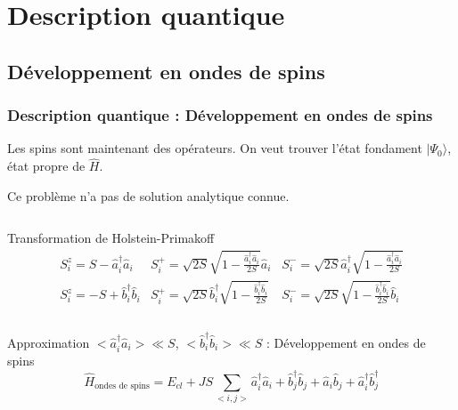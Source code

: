 \documentclass[xcolor=dvipsnames]{beamer}
\newcommand{\an}{\hat{a}}
\newcommand{\cre}{\hat{a}^\dagger}
\newcommand{\h}{\ensuremath{\hat{H}}\xspace}
\newcommand{\ban}{\hat{b}}
\newcommand{\bcre}{\hat{b}^\dagger}
\newcommand{\fond}{\ensuremath{| \Psi_0 \rangle}\xspace}
\newcommand{\1}{\ensuremath{\ket{\om_1\bom_1}}\xspace}
\newcommand{\2}{\ensuremath{\ket{\om_2\bom_2}}\xspace}
\begin{document}
\section{Description quantique}
\subsection{Développement en ondes de spins}
\begin{frame}
\frametitle{Description quantique : Développement en ondes de spins}
Les spins sont maintenant des opérateurs. On veut trouver l'état fondament \fond, état propre de \h.

Ce problème n'a pas de solution analytique connue.

\begin{columns}[t]
  \begin{column}{12cm}
  \begin{block}{Transformation de Holstein-Primakoff}
    \begin{eqnarray}
    S_i^z=S-\cre_i\an_i &  
    S_i^+=\sqrt{2S}\sqrt{1-\frac{\cre_i\an_i}{2S}}\an_i &
    S_i^-=\sqrt{2S}\cre_i\sqrt{1-\frac{\cre_i\an_i}{2S}} \\
	S_i^z=-S+\bcre_i\ban_i & 
	S_i^+=\sqrt{2S}\bcre_i\sqrt{1-\frac{\bcre_i\ban_i}{2S}}\ &
	S_i^-=\sqrt{2S}\sqrt{1-\frac{\bcre_i\ban_i}{2S}}\ban_i
    \end{eqnarray}
  \end{block} 
  \end{column}
\end{columns}

\begin{columns}
  \begin{column}{12cm}
  \begin{alertblock}{Approximation $<\cre_i\an_i>\ll S$, $<\bcre_i\ban_i>\ll S$ : Développement en ondes de spins}
  	\begin{equation}
	\h_{\text{ondes de spins}}=E_{cl}+JS\sum_{<i,j>}\cre_i\an_i+\bcre_j\ban_j+\an_i\ban_j+\cre_i\bcre_j
	\end{equation}
  \end{alertblock}
  \end{column}
\end{columns}
\end{frame}
\end{document}

